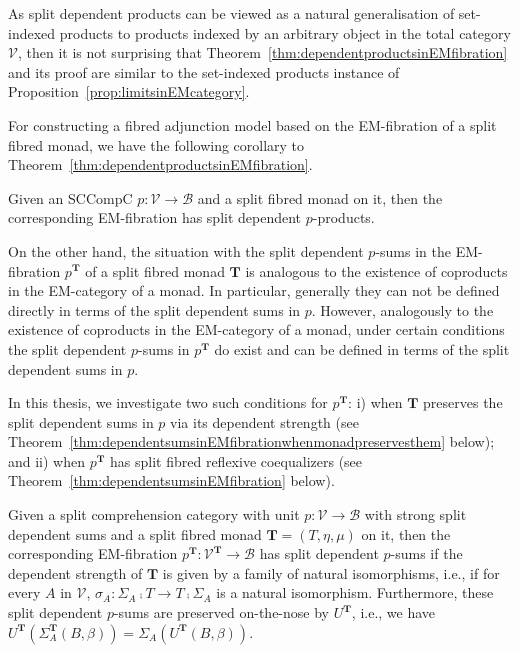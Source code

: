 As split dependent products can be viewed as a natural generalisation of set-indexed products to products indexed by an arbitrary object in the total category $\mathcal{V}$, then it is not surprising that Theorem~\ref{thm:dependentproductsinEMfibration} and its proof are similar to the set-indexed products instance of Proposition~\ref{prop:limitsinEMcategory}.

For constructing a fibred adjunction model based on the EM-fibration of a split fibred monad, 
we have the following corollary to Theorem~\ref{thm:dependentproductsinEMfibration}.

\begin{corollary}
Given an SCCompC $p : \mathcal{V} \longrightarrow \mathcal{B}$ and a split fibred monad on it, then the corresponding EM-fibration has split dependent $p$-products.
\end{corollary}

On the other hand, the situation with the split dependent $p$-sums in the EM-fibration $p^{\mathbf{T}}$ of a split fibred monad $\mathbf{T}$ is analogous to the existence of coproducts in the EM-category of a monad. In particular, generally they can not be defined directly in terms of the split dependent sums in $p$. However, analogously to the existence of coproducts in the EM-category of a monad, under certain conditions the split dependent $p$-sums in $p^{\mathbf{T}}$ do exist and can be defined in terms of the split dependent sums in $p$. 

In this thesis,  
we investigate two such conditions for $p^{\mathbf{T}}$: i) when $\mathbf{T}$ preserves the split dependent sums in $p$ via its dependent strength (see Theorem~\ref{thm:dependentsumsinEMfibrationwhenmonadpreservesthem} below); and ii) when $p^{\mathbf{T}}$ has split fibred reflexive coequalizers (see Theorem~\ref{thm:dependentsumsinEMfibration} below). 

\begin{theorem}
\label{thm:dependentsumsinEMfibrationwhenmonadpreservesthem}
Given a split comprehension category with unit $p : \mathcal{V} \longrightarrow \mathcal{B}$ with strong split dependent sums and a split fibred monad $\mathbf{T} = (T,\eta,\mu)$ on it, then the corresponding EM-fibration $p^{\mathbf{T}} : \mathcal{V}^{\mathbf{T}} \!\longrightarrow\! \mathcal{B}$ has split dependent $p$-sums if the dependent strength of $\mathbf{T}$ is given by a family of natural isomorphisms, i.e., if for every $A$ in $\mathcal{V}$, $\sigma_A : \Sigma_A \comp T \longrightarrow T \comp \Sigma_A$ is a natural isomorphism.
Furthermore, these split dependent $p$-sums are preserved on-the-nose by $U^{\mathbf{T}}$, i.e., we have $U^{\mathbf{T}}(\Sigma^{\mathbf{T}}_A(B,\beta)) = \Sigma_A(U^{\mathbf{T}}(B,\beta))$.
\end{theorem}

